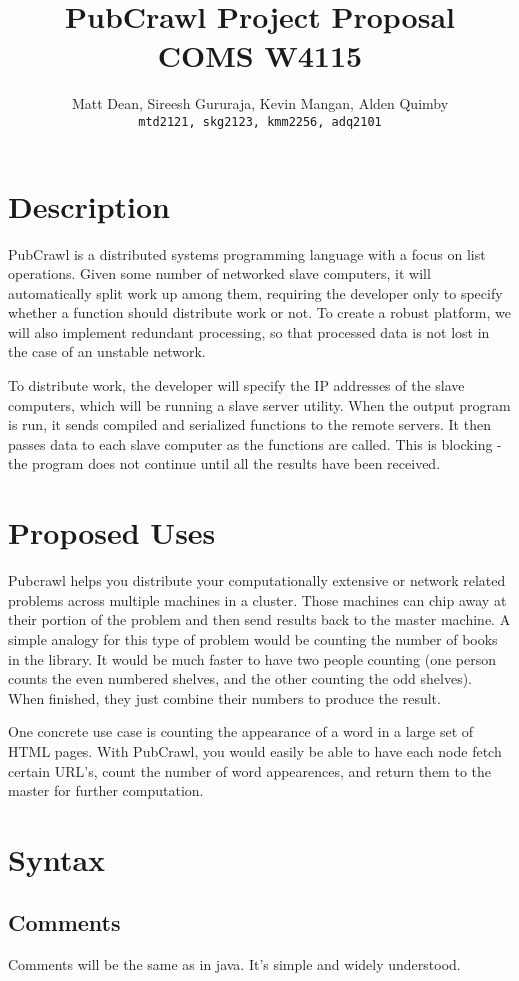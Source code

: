 \documentclass[letterpaper]{article}
\title{
  PubCrawl Project Proposal\\ \vspace{2 mm}
  \large{COMS W4115}
}
\author{
  Matt Dean, Sireesh Gururaja, Kevin Mangan, Alden Quimby\\
  \texttt{mtd2121, skg2123, kmm2256, adq2101}
}
\begin{document}
\maketitle

\section{Description}

PubCrawl is a distributed systems programming language with a focus on list operations. Given some number of networked slave computers, it will automatically split work up among them, requiring the developer only to specify whether a function should distribute work or not. To create a robust platform, we will also implement redundant processing, so that processed data is not lost in the case of an unstable network.

To distribute work, the developer will specify the IP addresses of the slave computers, which will be running a slave server utility. When the output program is run, it sends compiled and serialized functions to the remote servers. It then passes data to each slave computer as the functions are called. This is blocking - the program does not continue until all the results have been received.

\section{Proposed Uses}
Pubcrawl helps you distribute your computationally extensive or network related problems across multiple machines in a cluster. Those machines can chip away at their portion of the problem and then send results back to the master machine. A simple analogy for this type of problem would be counting the number of books in the library. It would be much faster to have two people counting (one person counts the even numbered shelves, and the other counting the odd shelves). When finished, they just combine their numbers to produce the result.

One concrete use case is counting the appearance of a word in a large set of HTML pages. With PubCrawl, you would easily be able to have each node fetch certain URL's, count the number of word appearences, and return them to the master for further computation. 

\section{Syntax}
\subsection{Comments}
Comments will be the same as in java. It's simple and widely understood.
\end{document}
